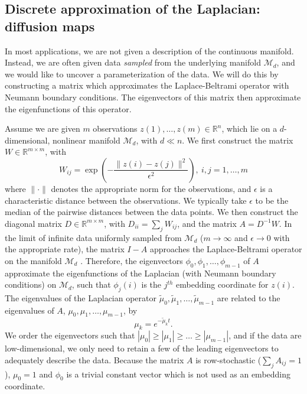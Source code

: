 \documentclass[preprint]{elsarticle}
\begin{document}


\subsection{Discrete approximation of the Laplacian: diffusion maps}

In most applications, we are not given a description of the continuous manifold. 
%
Instead, we are often given data {\em sampled} from the underlying manifold $\mathcal{M}_d$, and we would like to uncover a parameterization of the data.
%
We will do this by constructing a matrix which approximates the Laplace-Beltrami operator with Neumann boundary conditions. 
%
The eigenvectors of this matrix then approximate the eigenfunctions of this operator.

Assume we are given $m$ observations $z(1), \dots, z(m) \in \mathbb{R}^n$, which lie on a $d$-dimensional, nonlinear manifold $\mathcal{M}_d$, with $d \ll n$. 
%
We first construct the matrix $W \in \mathbb{R}^{m \times m}$, with
\begin{equation} \label{eq:W}
W_{ij} = \exp \left( -\frac{\|z(i) - z(j) \|^2}{\epsilon^2} \right), \ i,j=1,\ldots,m
\end{equation}
where $\| \cdot \|$ denotes the appropriate norm for the observations, and $\epsilon$ is a characteristic distance between the observations. 
%
We typically take $\epsilon$ to be the median of the pairwise distances between the data points.
%
We then construct the diagonal matrix $D \in \mathbb{R}^{m \times m}$, with $D_{ii} = \sum_j W_{ij}$, and the matrix $A  = D^{-1} W.$
%
In the limit of infinite data uniformly sampled from $\mathcal{M}_d$ ($m \rightarrow \infty$ and $\epsilon \rightarrow 0$ with the appropriate rate), the matrix $I-A$ approaches the Laplace-Beltrami operator on the manifold $\mathcal{M}_d$ \cite{...}. 
%
Therefore, the eigenvectors $\phi_0, \phi_1, \dots, \phi_{m-1}$ of $A$ approximate the eigenfunctions of the Laplacian (with Neumann boundary conditions) on $\mathcal{M}_d$, such that
$\phi_{j}(i)$ is the $j^{th}$ embedding coordinate for $z(i)$.
%
The eigenvalues of the Laplacian operator $\tilde{\mu}_0, \tilde{\mu}_1, \dots, \tilde{\mu}_{m-1}$ are related to the eigenvalues of $A$, $\mu_0, \mu_1, \dots, \mu_{m-1}$, by 
\begin{equation} \label{eq:evals_relationship}
\mu_k = e^{-\tilde{\mu}_k t}.
\end{equation}
%
We order the eigenvectors such that $|\mu_0| \ge |\mu_1| \ge \dots \ge |\mu_{m-1}|$, and if the data are low-dimensional, we only need to retain a few of the leading eigenvectors to adequately describe the data.
%
Because the matrix $A$ is row-stochastic ($\sum_j A_{ij} = 1$),  $\mu_0 = 1$ and $\phi_0$ is a trivial constant vector which is not used as an embedding coordinate.
\end{document}
